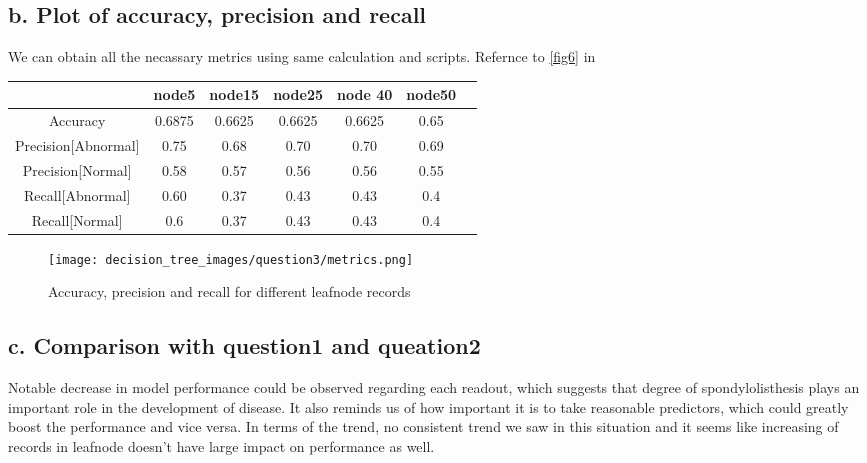 \documentclass{article}
\begin{document}
\subsection*{b. Plot of accuracy, precision and recall}
We can obtain all the necassary metrics using same calculation and scripts. Refernce to \autoref{fig6} in \pageref{fig6}
\begin{center}
    \begin{tabular}{|c|c|c|c|c|c|c|}
    \hline
     & node5 & node15 & node25 &node 40 & node50 \\
    \hline
    Accuracy & 0.6875 & 0.6625 & 0.6625 & 0.6625 & 0.65\\
    \hline
    Precision[Abnormal] & 0.75 & 0.68 & 0.70 & 0.70 & 0.69\\
    \hline
    Precision[Normal] & 0.58 & 0.57 & 0.56 & 0.56 & 0.55\\
    \hline
    Recall[Abnormal] & 0.60 & 0.37 & 0.43 & 0.43 & 0.4\\
    \hline
    Recall[Normal] & 0.6&0.37&0.43&0.43&0.4\\
    \hline
    \end{tabular}
\end{center}
\begin{figure}[H]
    \centering
    \texttt{[image: decision\_tree\_images/question3/metrics.png]}
    \caption{Accuracy, precision and recall for different leafnode records}
    \label{fig6}
\end{figure}
\subsection*{c. Comparison with question1 and queation2}
Notable decrease in model performance could be observed regarding each readout, which suggests that degree of spondylolisthesis plays an important role in the development of disease. It also reminds us of how important it is to take reasonable predictors, which could greatly boost the performance and vice versa. In terms of the trend, no consistent trend we saw in this situation and it seems like increasing of records in leafnode doesn't have large impact on performance as well.
\end{document}
